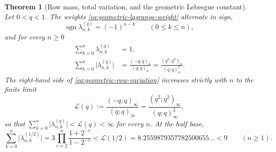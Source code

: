 \documentclass[11pt,oneside,openany]{book}
\newtheorem{theorem}{Theorem}[chapter]
\theoremstyle{definition}
\theoremstyle{remark}
\newcommand{\poch}[3]{(#1;#2)_{#3}}
\newcommand{\sgn}{\operatorname{sgn}}
\newcommand{\e}{\mathrm e}
\newcommand{\defeq}{\mathrel{:=}}
\begin{document}

\begin{theorem}[Row mass, total variation, and the geometric Lebesgue constant]\label{thm:geometric-row-variation}
Let $0<q<1$.  The weights \eqref{eq:geometric-lagrange-weight} alternate in sign,
\begin{equation}\label{eq:geometric-lagrange-signs}
 \sgn\lambda_{n,k}^{(q)}=(-1)^{n-k}
 \qquad(0\le k\le n),
\end{equation}
and for every $n\ge0$
\begin{align}
 \sum_{k=0}^{n}\lambda_{n,k}^{(q)}&=1,
 \label{eq:geometric-row-mass}\\
 \sum_{k=0}^{n}\bigl|\lambda_{n,k}^{(q)}\bigr|
 &=\frac{\poch{-q}{q}{n}}{\poch{q}{q}{n}}
  =\frac{\poch{q^2}{q^2}{n}}{\poch{q}{q}{n}^{2}} .
 \label{eq:geometric-row-variation}
\end{align}
The right-hand side of \eqref{eq:geometric-row-variation} increases strictly with $n$ to
the finite limit
\begin{equation}\label{eq:geometric-lebesgue-constant}
 \mathcal L(q)\defeq\frac{\poch{-q}{q}{\infty}}{\poch{q}{q}{\infty}}
              =\frac{\poch{q^2}{q^2}{\infty}}{\poch{q}{q}{\infty}^{2}},
\end{equation}
so that $\sum_{k=0}^{n}\bigl|\lambda_{n,k}^{(q)}\bigr|<\mathcal L(q)<\infty$ for every
$n$.  At the half base,
\begin{equation}\label{eq:halfbase-row-variation-bound}
 \sum_{k=0}^{n}\bigl|\lambda_{n,k}^{(1/2)}\bigr|
 =3\prod_{r=2}^{n}\frac{1+2^{-r}}{1-2^{-r}}
 <\mathcal L(1/2)=8.2559879357782500655\ldots<9
 \qquad(n\ge1).
\end{equation}
\end{theorem}
\end{document}
